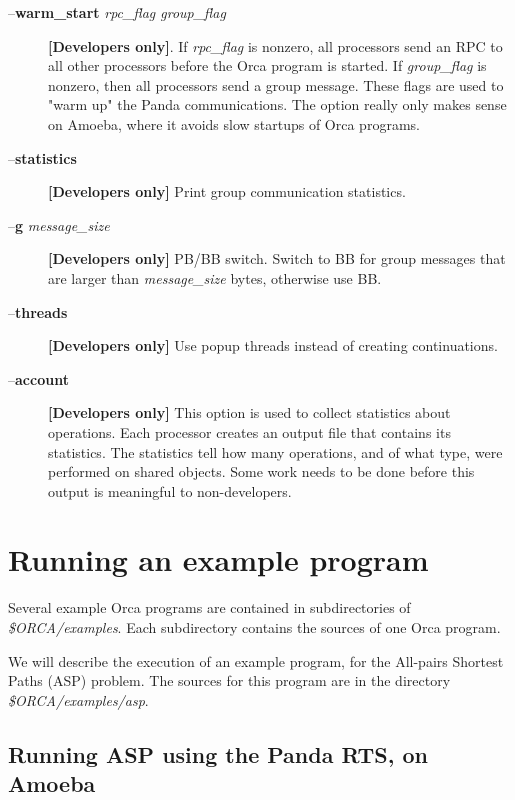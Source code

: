 \documentclass[10pt]{article}
\begin{document}
\begin{description}
\item[--{\bf warm\_start} {\em rpc\_flag group\_flag}]
{\bf [Developers only]}. If {\em rpc\_flag} is nonzero,
all processors send an RPC to all other 
processors before the Orca program is started.
If {\em group\_flag} is nonzero, then all processors send a group message.
These flags are used to "warm up" the Panda communications.
The option really only
makes sense on Amoeba, where it avoids slow startups of Orca programs.
\item[--{\bf statistics}]
{\bf [Developers only]} Print group communication statistics.
\item[--{\bf g} {\em message\_size}]
{\bf [Developers only]} PB/BB switch. Switch to BB for group messages that
are larger than {\em message\_size} bytes, otherwise use BB.
\item[--{\bf threads}]
{\bf [Developers only]} Use popup threads instead of creating
continuations.
\item[--{\bf account}]
{\bf [Developers only]} This option is used to collect statistics about
operations. Each processor creates an output file that contains its
statistics. The statistics tell how many operations, and of what type,
were performed on shared objects. Some work needs to be done before
this output is meaningful to non-developers.
\end{description}

\section{Running an example program}\label{sec:example}

Several example Orca programs are contained in subdirectories
of {\em \$ORCA/examples}.
Each subdirectory contains the sources of one Orca program.

We will describe the execution of an example program, for the
All-pairs Shortest Paths (ASP) problem.
The sources for this program are in the directory
{\em \$ORCA/examples/asp}.

\subsection{Running ASP using the Panda RTS, on Amoeba}
\end{document}
